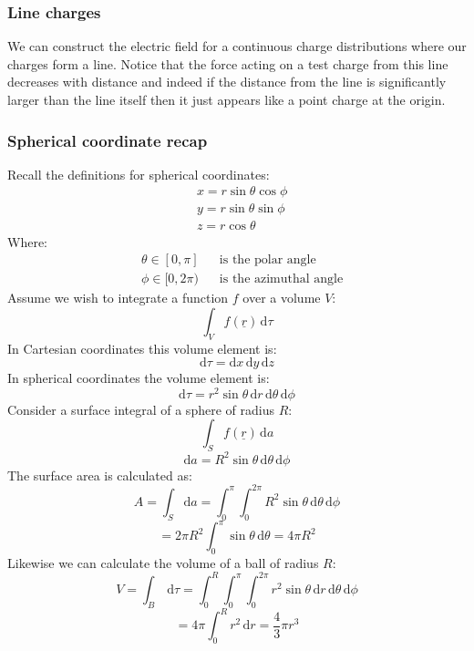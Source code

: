 \documentclass[12pt]{article}
\begin{document}
\subsubsection{Line charges}
We can construct the electric field for a continuous charge distributions where our charges form a line. Notice that the force acting on a test charge from this line decreases with distance and indeed if the distance from the line is significantly larger than the line itself then it just appears like a point charge at the origin.
\subsubsection{Spherical coordinate recap}
Recall the definitions for spherical coordinates:
\begin{align*}
    &x=r\sin\theta\cos\phi \\
    &y=r\sin\theta\sin\phi \\
    &z=r\cos\theta
\end{align*}
Where:
\begin{align*}
    &\theta\in[0,\pi] && \text{is the polar angle} \\
    &\phi\in [0,2\pi) && \text{is the azimuthal angle}
\end{align*}
Assume we wish to integrate a function \(f\) over a volume \(V\):
\[\int_V f(\underline{r})\,\text{d}\tau\]
In Cartesian coordinates this volume element is:
\[\text{d}\tau=\text{d}x\,\text{d}y\,\text{d}z\]
In spherical coordinates the volume element is:
\[\text{d}\tau=r^2\sin\theta\,\text{d}r\,\text{d}\theta\,\text{d}\phi\]
Consider a surface integral of a sphere of radius \(R\):
\[\int_Sf(\underline{r})\,\text{d}a\]
\[\text{d}a=R^2\sin\theta\,\text{d}\theta\,\text{d}\phi\]
The surface area is calculated as:
\[A=\int_S\text{d}a=\int^\pi_0\int^{2\pi}_0R^2\sin\theta\,\text{d}\theta\,\text{d}\phi\]
\[=2\pi R^2\int^\pi_0\sin\theta\,\text{d}\theta=4\pi R^2\]
Likewise we can calculate the volume of a ball of radius \(R\):
\[V=\int_B\,\text{d}\tau=\int^R_0\int^\pi_0\int^{2\pi}_0r^2\sin\theta\,\text{d}r\,\text{d}\theta\,\text{d}\phi\]
\[=4\pi\int^R_0r^2\,\text{d}r=\frac{4}{3}\pi r^3\]
\end{document}

